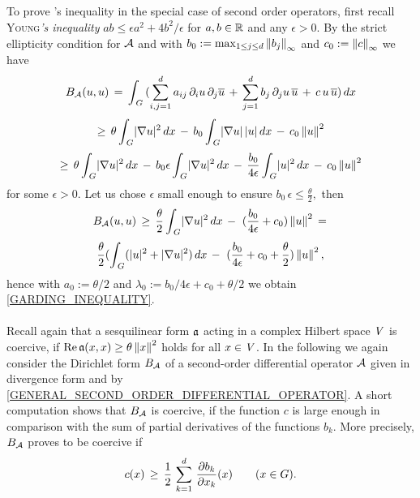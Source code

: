 \documentclass[11pt,twoside]{article}
\begin{document}
\subparagraph*{} %
To prove \textsc{\GARDING}'s inequality in the special case of second order operators,
first recall \textsc{Young}\textit{'s inequality}
$ab \leq \epsilon a^2 + 4b^2/ \epsilon$
for $a,b \in {\mathbb{R}}$ and any $\epsilon >0$.
By the strict ellipticity condition for ${\mathcal{A}}$ and with
$b_0 := \max_{1 \leq j \leq d} \left\lVert b_j \right\rVert_{\infty}$
and $c_0 := \left\lVert c \right\rVert_{\infty}$
we have
\[
B_{{\mathcal{A}}}(u,u) \,=\, \int_{\,G} \,
(
 \sum_{i,j=1}^d a_{ij} \, \partial_i u \, \partial_j \overline{u} \, + \,
 \sum_{j=1}^d   b_j \, \partial_j u \, \overline{u} \, + \,
 c \, u \, \overline{u}
) \, dx
\]
\[
\geq \, 
\theta \int_{\,\G} \abs{\nabla u} ^2 \, dx
\, - \,
b_0 \int_{\,\G} \abs{\nabla u} \, \abs{u} \, dx
\, - \, c_0 \norm{u}^2
\]
\[
\geq \, 
\theta \int_{\,\G} \abs{\nabla u} ^2 \, dx
\, - \,
b_0 \epsilon           \int_{\,\G} \abs{\nabla u} ^2 \, dx
\, - \,
\frac{b_0}{4 \epsilon} \int_{\,\G} \abs{u}        ^2 \, dx
\, - \, 
c_0 \norm{u}^2
\]
for some $\epsilon > 0$.
Let us chose $\epsilon$ small enough to ensure 
$
b_0 \, \epsilon \leq \frac{\theta}{2},
$
then
\[
\DF_{\A}(u,u)
\, \geq \, 
\frac{\theta}{2} \int_{\,\G} \abs{ \nabla u} ^2 \, dx
 \, - \, \,
(\frac{b_0}{4 \epsilon} + c_0) \norm{u}^2
\=
\]
\[
\frac{\theta}{2} (\int_{\,\G} (\abs{u} ^2 + \abs{ \nabla u} ^2) \, dx
 \, - \, \,
(\frac{b_0}{4 \epsilon} + c_0 + \frac{\theta}{2}) \norm{u}^2,
\]
hence with $a_0 := \theta/2$  and
$\lambda_0 := b_0 / 4 \epsilon + c_0 + \theta/2$
we obtain \eqref{GARDING_INEQUALITY}.

\paragraph*{} %
Recall again
that a sesquilinear form $\mathfrak{a}$ acting in a complex Hilbert space $\mathit{V}$
is coercive,
if $\operatorname{Re} \mathfrak{a}(x,x) \geq \theta \left\lVert x \right\rVert^2$ holds for all $x \in \mathit{V}$.
In the following we again consider the Dirichlet form $B_{{\mathcal{A}}}$
of a second-order differential operator ${\mathcal{A}}$
given in divergence form and 
by \eqref{GENERAL_SECOND_ORDER_DIFFERENTIAL_OPERATOR}.
A short computation shows
that $B_{{\mathcal{A}}}$ is coercive,
if the function $c$ is large enough in comparison
with the sum of partial derivatives of the functions $b_k$.
More precisely,
$B_{{\mathcal{A}}}$ proves to be coercive if
\begin{equation}\label{COERCIVITY_CONDITION}
c(x) \, \geq \, \frac{1}{2} \,
\sum_{k=1}^d \, \frac{\partial b_k}{\partial x_k}(x)
\quad \quad (x \in G).
\end{equation}
\end{document}
